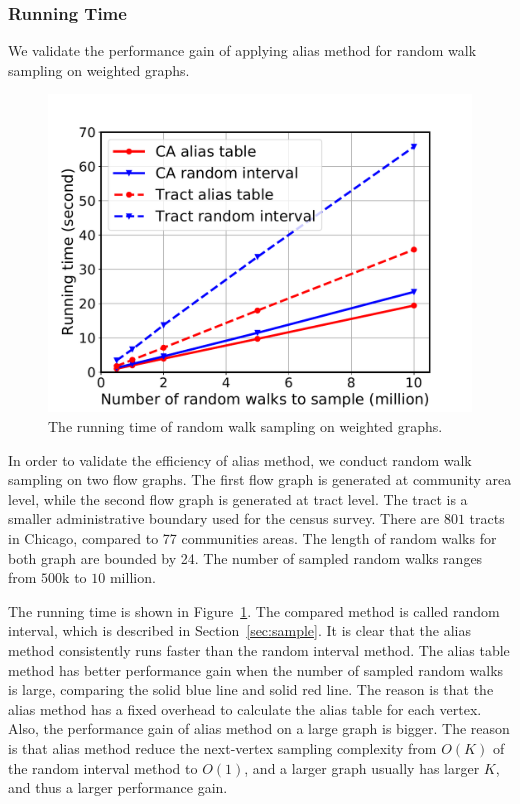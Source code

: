 \subsubsection{Running Time}
\label{sec:runtime}

We validate the performance gain of applying alias method for random walk sampling on weighted graphs.

\begin{figure}[h]
\centering
\includegraphics[width=0.6\linewidth]{fig/running-time.pdf}
\caption{The running time of random walk sampling on weighted graphs.}
\label{fig:run}
\end{figure}

In order to validate the efficiency of alias method, we conduct random walk sampling on two flow graphs. The first flow graph is generated at community area level, while the second flow graph is generated at tract level. The tract is a smaller administrative boundary used for the census survey. There are $801$ tracts in Chicago, compared to 77 communities areas. The length of random walks for both graph are bounded by 24. The number of sampled random walks ranges from $500$k to $10$ million.

The running time is shown in Figure~\ref{fig:run}. The compared method is called random interval, which is described in Section~\ref{sec:sample}. It is clear that the alias method consistently runs faster than the random interval method. The alias table method has better performance gain when the number of sampled random walks is large, comparing the solid blue line and solid red line. The reason is that the alias method has a fixed overhead to calculate the alias table for each vertex. Also, the performance gain of alias method on a large graph is bigger. The reason is that alias method reduce the next-vertex sampling complexity from $O(K)$ of the random interval method to $O(1)$, and a larger graph usually has larger $K$, and thus a larger performance gain. 




